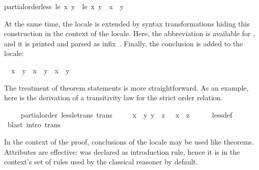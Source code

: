 \begin{isabellebody}
\begin{isamarkuptext}
\begin{isabelle}
\isaindent{\ \ }partial{\isacharunderscore}order{\isachardot}less\ {\isacharquery}le\ {\isacharquery}x\ {\isacharquery}y\ {\isacharequal}\ {\isacharparenleft}{\isacharquery}le\ {\isacharquery}x\ {\isacharquery}y\ {\isasymand}\ {\isacharquery}x\ {\isasymnoteq}\ {\isacharquery}y{\isacharparenright}%
\end{isabelle}
  At the same time, the locale is extended by syntax transformations
  hiding this construction in the context of the locale.  Here, the
  abbreviation  is available for
  , and it is printed
  and parsed as infix~\isa{{\isasymsqsubset}}.  Finally, the conclusion  is added to the locale:
  \begin{isabelle}%
\ \ {\isacharparenleft}{\isacharquery}x\ {\isasymsqsubset}\ {\isacharquery}y{\isacharparenright}\ {\isacharequal}\ {\isacharparenleft}{\isacharquery}x\ {\isasymsqsubseteq}\ {\isacharquery}y\ {\isasymand}\ {\isacharquery}x\ {\isasymnoteq}\ {\isacharquery}y{\isacharparenright}%
\end{isabelle}%
\end{isamarkuptext}%
\isamarkuptrue%
%
\begin{isamarkuptext}%
The treatment of theorem statements is more straightforward.
  As an example, here is the derivation of a transitivity law for the
  strict order relation.%
\end{isamarkuptext}%
\isamarkuptrue%
\ \ \isamarkupfalse%
\ {\isacharparenleft}\ partial{\isacharunderscore}order{\isacharparenright}\ less{\isacharunderscore}le{\isacharunderscore}trans\ {\isacharbrackleft}trans{\isacharbrackright}{\isacharcolon}\isanewline
\ \ \ \ {\isachardoublequoteopen}{\isasymlbrakk}\ x\ {\isasymsqsubset}\ y{\isacharsemicolon}\ y\ {\isasymsqsubseteq}\ z\ {\isasymrbrakk}\ {\isasymLongrightarrow}\ x\ {\isasymsqsubset}\ z{\isachardoublequoteclose}\isanewline
%
\isadelimvisible
\ \ \ \ %
\endisadelimvisible
%
\isatagvisible
{}\isamarkupfalse%
\ less{\isacharunderscore}def\ \isamarkupfalse%
\ {\isacharparenleft}blast\ intro{\isacharcolon}\ trans{\isacharparenright}%
\endisatagvisible
{\isafoldvisible}%
%
\isadelimvisible
%
\endisadelimvisible
%
\begin{isamarkuptext}%
In the context of the proof, conclusions of the
  locale may be used like theorems.  Attributes are effective:  was
  declared as introduction rule, hence it is in the context's set of
  rules used by the classical reasoner by default.%

\end{isamarkuptext}
\end{isabellebody}
